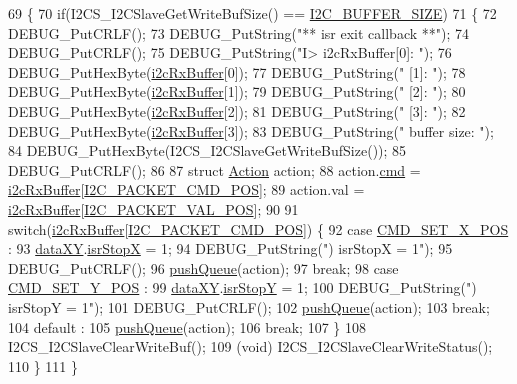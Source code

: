 \begin{DoxyCode}
69 \{
70   \textcolor{keywordflow}{if}(I2CS\_I2CSlaveGetWriteBufSize() == \hyperlink{i2c_8h_a6458dbf193a0eef0470fc1b08400bfcd}{I2C\_BUFFER\_SIZE})
71   \{
72     DEBUG\_PutCRLF();
73     DEBUG\_PutString(\textcolor{stringliteral}{"** isr exit callback **"});
74     DEBUG\_PutCRLF();
75     DEBUG\_PutString(\textcolor{stringliteral}{"I> i2cRxBuffer[0]: "});
76     DEBUG\_PutHexByte(\hyperlink{class_i2_c_a711782550427eea544dabe5394d79a9b}{i2cRxBuffer}[0]);
77     DEBUG\_PutString(\textcolor{stringliteral}{" [1]: "});
78     DEBUG\_PutHexByte(\hyperlink{class_i2_c_a711782550427eea544dabe5394d79a9b}{i2cRxBuffer}[1]);
79     DEBUG\_PutString(\textcolor{stringliteral}{" [2]: "});
80     DEBUG\_PutHexByte(\hyperlink{class_i2_c_a711782550427eea544dabe5394d79a9b}{i2cRxBuffer}[2]);
81     DEBUG\_PutString(\textcolor{stringliteral}{" [3]: "});
82     DEBUG\_PutHexByte(\hyperlink{class_i2_c_a711782550427eea544dabe5394d79a9b}{i2cRxBuffer}[3]);
83     DEBUG\_PutString(\textcolor{stringliteral}{" buffer size: "});
84     DEBUG\_PutHexByte(I2CS\_I2CSlaveGetWriteBufSize());
85     DEBUG\_PutCRLF();
86     
87     \textcolor{keyword}{struct }\hyperlink{queue_8h_df/d8c/struct_action}{Action} action;
88     action.\hyperlink{queue_8h_a85092d82ab6ea85dad51ba78cbda36a0}{cmd} = \hyperlink{class_i2_c_a711782550427eea544dabe5394d79a9b}{i2cRxBuffer}[\hyperlink{i2c_8h_ac13fcfeded7dc2d82fa4734456f3761f}{I2C\_PACKET\_CMD\_POS}];
89     action.val = \hyperlink{class_i2_c_a711782550427eea544dabe5394d79a9b}{i2cRxBuffer}[\hyperlink{i2c_8h_a68506c3651f015716bb2c135e8e7b972}{I2C\_PACKET\_VAL\_POS}];
90     
91     \textcolor{keywordflow}{switch}(\hyperlink{class_i2_c_a711782550427eea544dabe5394d79a9b}{i2cRxBuffer}[\hyperlink{i2c_8h_ac13fcfeded7dc2d82fa4734456f3761f}{I2C\_PACKET\_CMD\_POS}]) \{
92       \textcolor{keywordflow}{case} \hyperlink{handler_8h_af70b73890a98cfe329a916df037f46a4}{CMD\_SET\_X\_POS} :
93         \hyperlink{data_8h_a89d7998a721b3f36f9f4131e7a5e42d2}{dataXY}.\hyperlink{data_8h_ab8211b7be27d53644048a83fccb95d70}{isrStopX} = 1;
94         DEBUG\_PutString(\textcolor{stringliteral}{") isrStopX = 1"});
95         DEBUG\_PutCRLF();
96         \hyperlink{queue_8h_a0012fa831aa1529e5ed3a6610b733423}{pushQueue}(action);
97         \textcolor{keywordflow}{break};
98       \textcolor{keywordflow}{case} \hyperlink{handler_8h_a82640a671f668fb40ff4851901d5a151}{CMD\_SET\_Y\_POS} :
99         \hyperlink{data_8h_a89d7998a721b3f36f9f4131e7a5e42d2}{dataXY}.\hyperlink{data_8h_a92ec85e6a09f5dc7ed83640f1810c4bb}{isrStopY} = 1;
100         DEBUG\_PutString(\textcolor{stringliteral}{") isrStopY = 1"});
101         DEBUG\_PutCRLF();
102         \hyperlink{queue_8h_a0012fa831aa1529e5ed3a6610b733423}{pushQueue}(action);
103         \textcolor{keywordflow}{break};
104       \textcolor{keywordflow}{default} :
105         \hyperlink{queue_8h_a0012fa831aa1529e5ed3a6610b733423}{pushQueue}(action);
106         \textcolor{keywordflow}{break};
107     \}
108     I2CS\_I2CSlaveClearWriteBuf();
109     (void) I2CS\_I2CSlaveClearWriteStatus();
110   \}
111 \}
\end{DoxyCode}


